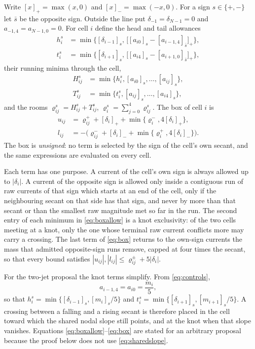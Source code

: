 \documentclass[journal]{IEEEtran}
\begin{document}
Write \([x]_+=\max(x,0)\) and \([x]_-=\max(-x,0)\). For a sign
\(s\in\{+,-\}\) let \(\bar s\) be the opposite sign. Outside the line put
\(\delta_{-1}=\delta_{N-1}=0\) and \(a_{-1,4}=a_{N-1,0}=0\). For cell \(i\)
define the head and tail allowances
\begin{align}
 h_i^s&=\min\bigl\{[\delta_{i-1}]_s,\,
 \bigl[[a_{i0}]_s-[a_{i-1,4}]_{\bar s}\bigr]_+\bigr\},\nonumber\\
 t_i^s&=\min\bigl\{[\delta_{i+1}]_s,\,
 \bigl[[a_{i4}]_s-[a_{i+1,0}]_{\bar s}\bigr]_+\bigr\},
 \label{eq:boxallow}
\end{align}
their running minima through the cell,
\begin{align}
 H_{ij}^s&=\min\{h_i^s,[a_{i0}]_s,\ldots,[a_{ij}]_s\},\nonumber\\
 T_{ij}^s&=\min\{t_i^s,[a_{ij}]_s,\ldots,[a_{i4}]_s\},
 \label{eq:boxruns}
\end{align}
and the rooms
\(\varrho_{ij}^s=H_{ij}^s+T_{ij}^s\),
\(\varrho_i^s=\sum_{j=0}^{4}\varrho_{ij}^s\). The box of cell \(i\) is
\begin{align}
 u_{ij}&=\varrho_{ij}^{+}+[\delta_i]_+
 +\min\{\varrho_i^{-},4[\delta_i]_+\},\nonumber\\
 l_{ij}&=-\bigl(\varrho_{ij}^{-}+[\delta_i]_-
 +\min\{\varrho_i^{+},4[\delta_i]_-\}\bigr).
 \label{eq:box}
\end{align}
The box is \emph{unsigned}: no term is selected by the sign of the cell's
own secant, and the same expressions are evaluated on every cell.

Each term has one purpose. A current of the cell's own sign is always
allowed up to \(|\delta_i|\). A current of the opposite sign is allowed
only inside a contiguous run of raw currents of that sign which starts at
an end of the cell, only if the neighbouring secant on that side has that
sign, and never by more than that secant or than the smallest raw
magnitude met so far in the run. The second entry of each minimum in
\eqref{eq:boxallow} is a knot exclusivity: of the two cells meeting at a
knot, only the one whose terminal raw current conflicts more may carry a
crossing. The last term of \eqref{eq:box} returns to the own-sign currents
the mass that admitted opposite-sign runs remove, capped at four times the
secant, so that every bound satisfies
\(|u_{ij}|,|l_{ij}|\le\varrho_{ij}^{\pm}+5|\delta_i|\).

For the two-jet proposal the knot terms simplify. From
\eqref{eq:controls},
\begin{equation}
 a_{i-1,4}=a_{i0}=\frac{m_i}{5},
 \label{eq:sharedslope}
\end{equation}
so that \(h_i^s=\min\{[\delta_{i-1}]_s,[m_i]_s/5\}\) and
\(t_i^s=\min\{[\delta_{i+1}]_s,[m_{i+1}]_s/5\}\). A crossing between a
falling and a rising secant is therefore placed in the cell toward which
the shared nodal slope still points, and at the knot when that slope
vanishes. Equations \eqref{eq:boxallow}--\eqref{eq:box} are stated for an
arbitrary proposal because the proof below does not use
\eqref{eq:sharedslope}.
\end{document}
